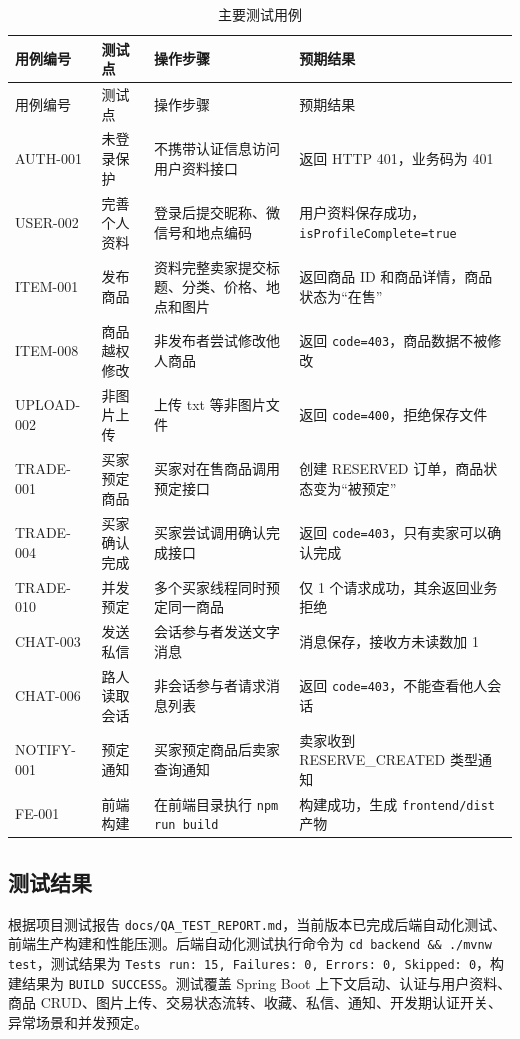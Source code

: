 ﻿\documentclass[UTF8,a4paper,12pt]{ctexart}
\begin{document}
\begin{longtable}{p{2.4cm}p{3.5cm}p{4.5cm}p{3cm}}
  \caption{主要测试用例}\label{tab:main-test-cases} \\
  \toprule
  用例编号 & 测试点 & 操作步骤 & 预期结果 \\
  \midrule
  \endfirsthead
  \toprule
  用例编号 & 测试点 & 操作步骤 & 预期结果 \\
  \midrule
  \endhead
  AUTH-001 & 未登录保护 & 不携带认证信息访问用户资料接口 & 返回 HTTP 401，业务码为 401 \\
  USER-002 & 完善个人资料 & 登录后提交昵称、微信号和地点编码 & 用户资料保存成功，\texttt{isProfileComplete=true} \\
  ITEM-001 & 发布商品 & 资料完整卖家提交标题、分类、价格、地点和图片 & 返回商品 ID 和商品详情，商品状态为“在售” \\
  ITEM-008 & 商品越权修改 & 非发布者尝试修改他人商品 & 返回 \texttt{code=403}，商品数据不被修改 \\
  UPLOAD-002 & 非图片上传 & 上传 txt 等非图片文件 & 返回 \texttt{code=400}，拒绝保存文件 \\
  TRADE-001 & 买家预定商品 & 买家对在售商品调用预定接口 & 创建 RESERVED 订单，商品状态变为“被预定” \\
  TRADE-004 & 买家确认完成 & 买家尝试调用确认完成接口 & 返回 \texttt{code=403}，只有卖家可以确认完成 \\
  TRADE-010 & 并发预定 & 多个买家线程同时预定同一商品 & 仅 1 个请求成功，其余返回业务拒绝 \\
  CHAT-003 & 发送私信 & 会话参与者发送文字消息 & 消息保存，接收方未读数加 1 \\
  CHAT-006 & 路人读取会话 & 非会话参与者请求消息列表 & 返回 \texttt{code=403}，不能查看他人会话 \\
  NOTIFY-001 & 预定通知 & 买家预定商品后卖家查询通知 & 卖家收到 RESERVE\_CREATED 类型通知 \\
  FE-001 & 前端构建 & 在前端目录执行 \texttt{npm run build} & 构建成功，生成 \texttt{frontend/dist} 产物 \\
  \bottomrule
\end{longtable}

\subsection{测试结果}
根据项目测试报告 \texttt{docs/QA\_TEST\_REPORT.md}，当前版本已完成后端自动化测试、前端生产构建和性能压测。后端自动化测试执行命令为 \texttt{cd backend \&\& ./mvnw test}，测试结果为 \texttt{Tests run: 15, Failures: 0, Errors: 0, Skipped: 0}，构建结果为 \texttt{BUILD SUCCESS}。测试覆盖 Spring Boot 上下文启动、认证与用户资料、商品 CRUD、图片上传、交易状态流转、收藏、私信、通知、开发期认证开关、异常场景和并发预定。
\end{document}
